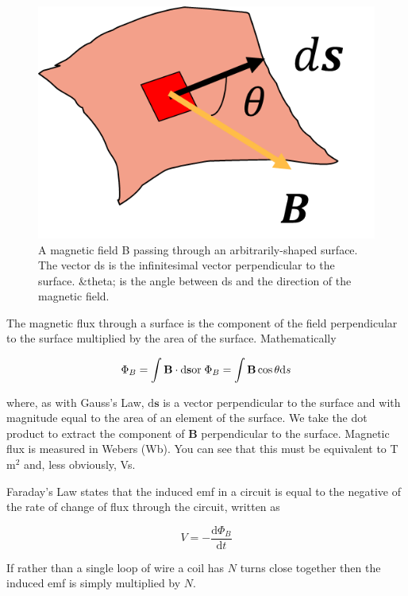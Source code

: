 \documentclass[
]{book}
\numberwithin{equation}{section}
\begin{document}
\begin{figure}

{\centering \includegraphics[width=0.7\linewidth]{Figures/magFlux} 

}

\caption{A magnetic field B passing through an arbitrarily-shaped surface. The vector ds is the infinitesimal vector perpendicular to the surface. &theta; is the angle between ds and the direction of the magnetic field.}\label{fig:magFlux}
\end{figure}

The magnetic flux through a surface is the component of the field
perpendicular to the surface multiplied by the area of the surface.
Mathematically

\begin{equation}
\label{eq:magFlux}
\Phi_B = \int\mathbf{B} \cdot \mathrm{d}\mathbf{s} \\  
\text{or} \; \Phi_B = \int \mathbf{B} \cos\theta \mathrm{d} s
\end{equation}

where, as with Gauss's Law, \(\mathrm{d} \mathbf{s}\) is a vector perpendicular to the
surface and with magnitude equal to the area of an element of the
surface. We take the dot product to extract the component of \(\mathbf{B}\)
perpendicular to the surface. Magnetic flux is measured in Webers (Wb).
You can see that this must be equivalent to T m\(^2\) and, less obviously,
Vs.

Faraday's Law states that the induced emf in a circuit is equal to the
negative of the rate of change of flux through the circuit, written as

\begin{equation}
\label{eq:faradaysLaw}
V = - \frac{\mathrm{d} \Phi_B}{\mathrm{d} t}
\end{equation}

If rather than a single loop of wire a coil has \(N\) turns close together
then the induced emf is simply multiplied by \(N\).
\end{document}
